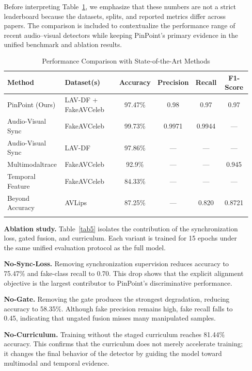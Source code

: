 \documentclass[pdflatex,sn-mathphys-num]{sn-jnl}
\begin{document}
Before interpreting Table~\ref{tab4}, we emphasize that these numbers are not a strict leaderboard because the datasets, splits, and reported metrics differ across papers. The comparison is included to contextualize the performance range of recent audio--visual detectors while keeping PinPoint's primary evidence in the unified benchmark and ablation results.

\begin{table}[htbp]
\caption{Performance Comparison with State-of-the-Art Methods}\label{tab4}
\small
\setlength{\tabcolsep}{3pt}
\begin{tabularx}{\textwidth}{@{}Xp{2.8cm}cccc@{}}
\toprule
\textbf{Method} & \textbf{Dataset(s)} & \textbf{Accuracy} & \textbf{Precision} & \textbf{Recall} & \textbf{F1-Score} \\
\midrule
PinPoint (Ours) & LAV-DF + FakeAVCeleb & 97.47\% & 0.98 & 0.97 & 0.97 \\
Audio-Visual Sync \cite{ref5} & FakeAVCeleb & 99.73\% & 0.9971 & 0.9944 & --- \\
Audio-Visual Sync \cite{ref5} & LAV-DF & 97.86\% & --- & --- & --- \\
Multimodaltrace \cite{ref1} & FakeAVCeleb & 92.9\% & --- & --- & 0.945 \\
Temporal Feature \cite{ref2} & FakeAVCeleb & 84.33\% & --- & --- & --- \\
Beyond Accuracy \cite{ref20} & AVLips & 87.25\% & --- & 0.820 & 0.8721 \\
\botrule
\end{tabularx}
\end{table}

\textbf{Ablation study.} Table~\ref{tab5} isolates the contribution of the synchronization loss, gated fusion, and curriculum. Each variant is trained for 15 epochs under the same unified evaluation protocol as the full model.

\textbf{No-Sync-Loss.} Removing synchronization supervision reduces accuracy to 75.47\% and fake-class recall to 0.70. This drop shows that the explicit alignment objective is the largest contributor to PinPoint's discriminative performance.

\textbf{No-Gate.} Removing the gate produces the strongest degradation, reducing accuracy to 58.35\%. Although fake precision remains high, fake recall falls to 0.45, indicating that ungated fusion misses many manipulated samples.

\textbf{No-Curriculum.} Training without the staged curriculum reaches 81.44\% accuracy. This confirms that the curriculum does not merely accelerate training; it changes the final behavior of the detector by guiding the model toward multimodal and temporal evidence.
\end{document}
